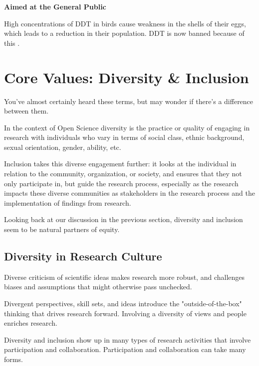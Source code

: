 \documentclass[
]{book}
\begin{document}
\textbf{Aimed at the General Public}

High concentrations of DDT in birds cause weakness in the shells of their eggs, which leads to a reduction in their population. DDT is now banned because of this \citep{bbc_bitesize_food_nodate}.

\hypertarget{core-values-diversity-inclusion}{%
\section{Core Values: Diversity \& Inclusion}\label{core-values-diversity-inclusion}}

You've almost certainly heard these terms, but may wonder if there's a difference between them.

In the context of Open Science diversity is the practice or quality of engaging in research with individuals who vary in terms of social class, ethnic background, sexual orientation, gender, ability, etc.

Inclusion takes this diverse engagement further: it looks at the individual in relation to the community, organization, or society, and ensures that they not only participate in, but guide the research process, especially as the research impacts these diverse communities as stakeholders in the research process and the implementation of findings from research.

Looking back at our discussion in the previous section, diversity and inclusion seem to be natural partners of equity.

\hypertarget{diversity-in-research-culture}{%
\subsection*{Diversity in Research Culture}\label{diversity-in-research-culture}}

Diverse criticism of scientific ideas makes research more robust, and challenges biases and assumptions that might otherwise pass unchecked.

Divergent perspectives, skill sets, and ideas introduce the "outside-of-the-box" thinking that drives research forward. Involving a diversity of views and people enriches research.

Diversity and inclusion show up in many types of research activities that involve participation and collaboration. Participation and collaboration can take many forms.
\end{document}
